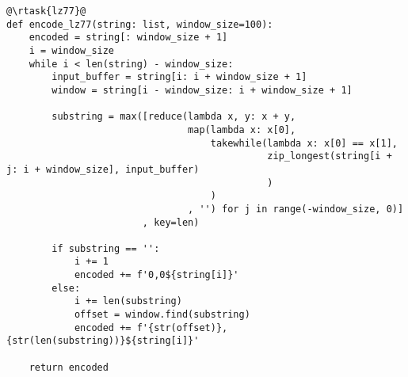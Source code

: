 \begin{verbatim}
@\rtask{lz77}@
def encode_lz77(string: list, window_size=100):
    encoded = string[: window_size + 1]
    i = window_size
    while i < len(string) - window_size:
        input_buffer = string[i: i + window_size + 1]
        window = string[i - window_size: i + window_size + 1]

        substring = max([reduce(lambda x, y: x + y,
                                map(lambda x: x[0],
                                    takewhile(lambda x: x[0] == x[1],
                                              zip_longest(string[i + j: i + window_size], input_buffer)
                                              )
                                    )
                                , '') for j in range(-window_size, 0)]
                        , key=len)

        if substring == '':
            i += 1
            encoded += f'0,0${string[i]}'
        else:
            i += len(substring)
            offset = window.find(substring)
            encoded += f'{str(offset)},{str(len(substring))}${string[i]}'

    return encoded
\end{verbatim}